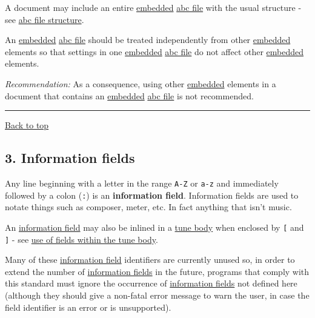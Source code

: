 A document may include an entire
\protect\hyperlink{embedded_definition}{embedded}
\protect\hyperlink{abc_file_definition}{abc file} with the usual
structure - see \protect\hyperlink{abc_file_structure}{abc file
structure}.

An \protect\hyperlink{embedded_definition}{embedded}
\protect\hyperlink{abc_file_definition}{abc file} should be treated
independently from other
\protect\hyperlink{embedded_definition}{embedded} elements so that
settings in one \protect\hyperlink{embedded_definition}{embedded}
\protect\hyperlink{abc_file_definition}{abc file} do not affect other
\protect\hyperlink{embedded_definition}{embedded} elements.

\emph{Recommendation:} As a consequence, using other
\protect\hyperlink{embedded_definition}{embedded} elements in a document
that contains an \protect\hyperlink{embedded_definition}{embedded}
\protect\hyperlink{abc_file_definition}{abc file} is not recommended.

\begin{center}\rule{0.5\linewidth}{\linethickness}\end{center}

\protect\hyperlink{}{Back to top}

\hypertarget{information_fields}{\subsection{3. Information
fields}\label{information_fields}}

\href{}{}Any line beginning with a letter in the range \texttt{A-Z} or
\texttt{a-z} and immediately followed by a colon (\texttt{:}) is an
\textbf{information field}. Information fields are used to notate things
such as composer, meter, etc. In fact anything that isn't music.

An \protect\hyperlink{information_field_definition}{information field}
may also be inlined in a \protect\hyperlink{tune_body_definition}{tune
body} when enclosed by \texttt{{[}} and \texttt{{]}} - see
\protect\hyperlink{use_of_fields_within_the_tune_body}{use of fields
within the tune body}.

Many of these
\protect\hyperlink{information_field_definition}{information field}
identifiers are currently unused so, in order to extend the number of
\protect\hyperlink{information_field_definition}{information fields} in
the future, programs that comply with this standard must ignore the
occurrence of
\protect\hyperlink{information_field_definition}{information fields} not
defined here (although they should give a non-fatal error message to
warn the user, in case the field identifier is an error or is
unsupported).

